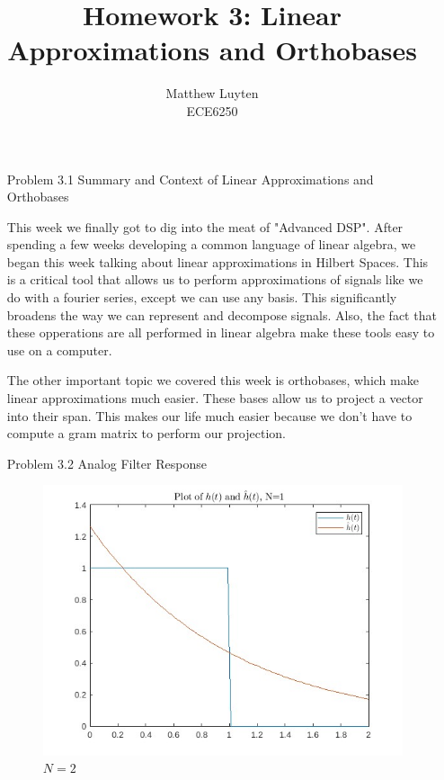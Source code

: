 \documentclass[12pt]{article}
\begin{document}
 
\title{Homework 3: Linear Approximations and Orthobases}
\author{Matthew Luyten\\ %
ECE6250}

\maketitle

\begin{enumerate}
\item[Problem 3.1] Summary and Context of Linear Approximations and Orthobases

This week we finally got to dig into the meat of "Advanced DSP". After spending a few weeks developing a common 
language of linear algebra, we began this week talking about linear approximations in Hilbert Spaces. This is a
critical tool that allows us to perform approximations of signals like we do with a fourier series, except
we can use any basis. This significantly broadens the way we can represent and decompose signals. Also,
the fact that these opperations are all performed in linear algebra make these tools easy to use on a computer.

The other important topic we covered this week is orthobases, which make linear approximations much easier. 
These bases allow us to project a vector into their span. This makes our life much easier because we don't
have to compute a gram matrix to perform our projection.


\newpage

\item[Problem 3.2] Analog Filter Response

\begin{figure}[h]
    \caption{$N=2$}
    \centering
    \includegraphics[scale=0.5]{3-2_a.jpg}
\end{figure}


\end{enumerate}
\end{document}
